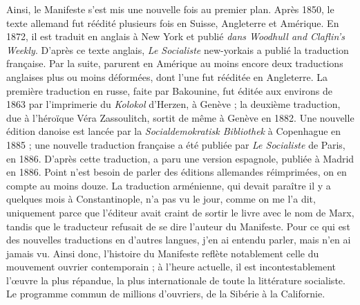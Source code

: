 \documentclass[french,twoside]{book} %
\begin{document}
Ainsi, le Manifeste s’est mis une nouvelle fois au premier plan. Après 1850, le texte allemand fut réédité plusieurs fois en Suisse, Angleterre et Amérique. En 1872, il est traduit en anglais à New York et publié \emph{dans Woodhull and Claflin’s Weekly}. D'après ce texte anglais, \emph{Le Socialiste} new-yorkais a publié la traduction française. Par la suite, parurent en Amérique au moins encore deux traductions anglaises plus ou moins déformées, dont l’une fut rééditée en Angleterre. La première traduction en russe, faite par Bakounine, fut éditée aux environs de 1863 par l’imprimerie du \emph{Kolokol} d’Herzen, à Genève ; la deuxième traduction, due à l’héroïque Véra Zassoulitch, sortit de même à Genève en 1882. Une nouvelle édition danoise est lancée par la \emph{Socialdemokratisk Bibliothek} à Copenhague en 1885 ; une nouvelle traduction française a été publiée par\emph{ Le Socialiste} de Paris, en 1886. D'après cette traduction, a paru une version espagnole, publiée à Madrid en 1886. Point n’est besoin de parler des éditions allemandes réimprimées, on en compte au moins douze. La traduction arménienne, qui devait paraître il y a quelques mois à Constantinople, n’a pas vu le jour, comme on me l’a dit, uniquement parce que l’éditeur avait craint de sortir le livre avec le nom de Marx, tandis que le traducteur refusait de se dire l’auteur du Manifeste. Pour ce qui est des nouvelles traductions en d’autres langues, j’en ai entendu parler, mais n’en ai jamais vu. Ainsi donc, l’histoire du Manifeste reflète notablement celle du mouvement ouvrier contemporain ; à l’heure actuelle, il est incontestablement l’œuvre la plus répandue, la plus internationale de toute la littérature socialiste. Le programme commun de millions d’ouvriers, de la Sibérie à la Californie.\par
\end{document}
